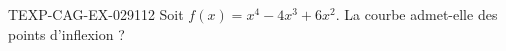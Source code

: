 \begin{exercice}{TEXP-CAG-EX-029}{1}{12}
Soit $f(x) = x^4 - 4x^3 + 6x^2$. La courbe admet-elle des points d'inflexion ?

\end{exercice}
